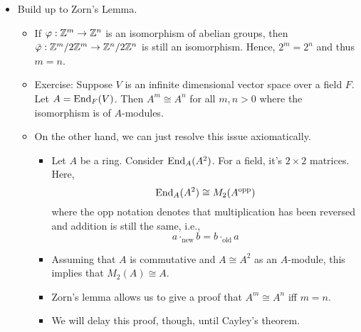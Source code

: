 \documentclass[../notes.tex]{subfiles}
\begin{document}
\begin{itemize}
    \begin{proof}
        You can either do this in one short proof with horrible notation, or you can prove it for $n=1$ and say that induction solves the rest. We'll do the latter.\par
        The existence of $\varphi$ says that there exists a surjection of $A$-modules $\psi:M\to A$ with $\ker\psi=M'$. "Take $\psi^{-1}(1)$ and set it equal to $e$. Then repeat the (previous??) proof." Choose $e\in M$ such that $\varphi(e)=1$. Then $T:M'\oplus A\to M$, $T(m',a)=m'+ae$ for all $m'\in M'$ and $a\in A$. To check that $T$ is onto will proceed symmetrically to in the previous proof.
        (Let $m\in M$ Put $a=\varphi(m)$. Then $a=\varphi(ae)$. Put $m'=m-ae$. Then $\varphi(m')=\varphi(m-ae)=\varphi(m)-\varphi(ae)=a-a=0$. (This $\varphi$ may be $\psi$!). Therefore, $m'\in M$ and $T(m',a)=m$ is onto.)
        How about $\ker(T)$? Let $m'\in M'$. We have $(m',a)\in\ker(T)$ implies $m'+ae=0$. Then $\varphi(m'+ae)=0$, $\varphi(m')+a=0$, $m'=0$.
    \end{proof}
    \item Build up to Zorn's Lemma.
    \begin{itemize}
        \item If $\varphi:\mathbb{Z}^m\to\mathbb{Z}^n$ is an isomorphism of abelian groups, then $\bar{\varphi}:\mathbb{Z}^m/2\mathbb{Z}^m\to\mathbb{Z}^n/2\mathbb{Z}^n$ is still an isomorphism. Hence, $2^m=2^n$ and thus $m=n$.
        \item Exercise: Suppose $V$ is an infinite dimensional vector space over a field $F$. Let $A=\operatorname{End}_F(V)$. Then $A^m\cong A^n$ for all $m,n>0$ where the isomorphism is of $A$-modules.
        \item On the other hand, we can just resolve this issue axiomatically.
        \begin{itemize}
            \item Let $A$ be a ring. Consider $\operatorname{End}_A(A^2)$. For a field, it's $2\times 2$ matrices. Here,
            \begin{equation*}
                \operatorname{End}_A(A^2) \cong M_2(A^\text{opp})
            \end{equation*}
            where the opp notation denotes that multiplication has been reversed and addition is still the same, i.e.,
            \begin{equation*}
                a\cdot_\text{new}b = b\cdot_\text{old}a
            \end{equation*}
            \item Assuming that $A$ is commutative and $A\cong A^2$ as an $A$-module, this implies that $M_2(A)\cong A$.
            \item Zorn's lemma allows us to give a proof that $A^m\cong A^n$ iff $m=n$.
            \item We will delay this proof, though, until Cayley's theorem.
        \end{itemize}
    \end{itemize}
\end{itemize}
\end{document}
